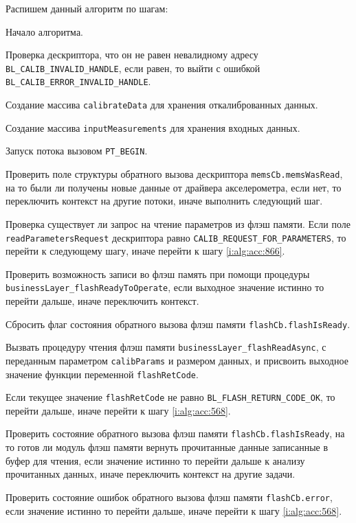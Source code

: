 Распишем данный алгоритм по шагам:
\begin{enumerate_step}
    \item Начало алгоритма.
    \item Проверка дескриптора, что он не равен невалидному адресу \lstinline|BL_CALIB_INVALID_HANDLE|, если равен, то выйти с ошибкой
    \lstinline|BL_CALIB_ERROR_INVALID_HANDLE|.
    \item Создание массива \lstinline|calibrateData| для хранения откалиброванных данных.
    \item Создание массива \lstinline|inputMeasurements| для хранения входных данных.
    \item Запуск потока вызовом \lstinline|PT_BEGIN|.
    \item \label{i:alg:acc:850} Проверить поле структуры обратного вызова дескриптора \lstinline|memsCb.memsWasRead|, на то были ли получены новые данные от драйвера акселерометра, 
    если нет, то переключить контекст на другие потоки, иначе выполнить следующий шаг.
    \item \label{i:alg:acc:857} Проверка существует ли запрос на чтение параметров из флэш памяти. Если поле \lstinline|readParametersRequest| дескриптора равно \lstinline|CALIB_REQUEST_FOR_PARAMETERS|,
    то перейти к следующему шагу, иначе перейти к шагу \ref{i:alg:acc:866}.
    \item Проверить возможность записи во флэш память при помощи процедуры \lstinline|businessLayer_flashReadyToOperate|, если выходное значение истинно то перейти дальше, иначе переключить контекст.
    \item Сбросить флаг состояния обратного вызова флэш памяти \lstinline|flashCb.flashIsReady|.
    \item Вызвать процедуру чтения флэш памяти \lstinline|businessLayer_flashReadAsync|, с переданным параметром \lstinline|calibParams| и размером данных, и присвоить выходное значение функции переменной \lstinline|flashRetCode|.
    \item Если текущее значение \lstinline|flashRetCode| не равно \lstinline|BL_FLASH_RETURN_CODE_OK|, то перейти дальше, иначе перейти к шагу
    \ref{i:alg:acc:568}.
    \item Проверить состояние обратного вызова флэш памяти \lstinline|flashCb.flashIsReady|, на то готов ли модуль флэш памяти вернуть прочитанные данные записанные 
    в буфер для чтения, если значение истинно то перейти дальше к анализу прочитанных данных, иначе переключить контекст на другие задачи.
    \item Проверить состояние ошибок обратного вызова флэш памяти \lstinline|flashCb.error|, если значение истинно то перейти дальше, иначе перейти к шагу \ref{i:alg:acc:568}.

\end{enumerate_step}

